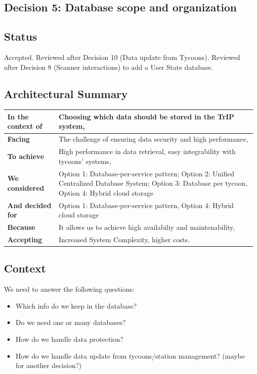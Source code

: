 \subsection{Decision 5: Database scope and organization}

\subsection*{Status}
Accepted. Reviewed after Decision 10 (Data update from Tycoons). Reviewed after Decision 8 (Scanner interactions) to add a User State database.

\subsection*{Architectural Summary}
\begin{tabular}{|p{3.5cm}|p{10.5cm}|}
    \hline
    \textbf{In the context of} & Choosing which data should be stored in the TrIP system, \\
    \hline
    \textbf{Facing} & The challenge of ensuring data security and high performance, \\
    \hline
    \textbf{To achieve} & High performance in data retrieval, easy integrability with tycoons' systems, \\
    \hline
    \textbf{We considered} & Option 1: Database-per-service pattern; Option 2: Unified Centralized Database System; Option 3: Database per tycoon, Option 4: Hybrid cloud storage\\
    \hline
    \textbf{And decided for} & Option 1: Database-per-service pattern, Option 4: Hybrid cloud storage \\
    \hline
    \textbf{Because} & It allows us to achieve high availabiliy and maintenability, \\
    \hline
    \textbf{Accepting} & Increased System Complexity, higher costs. \\
    \hline
\end{tabular}

\subsection*{Context}
We need to answer the following questions:
\begin{itemize}
\item Which info do we keep in the database? 
\item Do we need one or many databases?
\item How do we handle data protection?
\item How do we handle data update from tycoons/station management? (maybe for another decision?)
\end{itemize}

